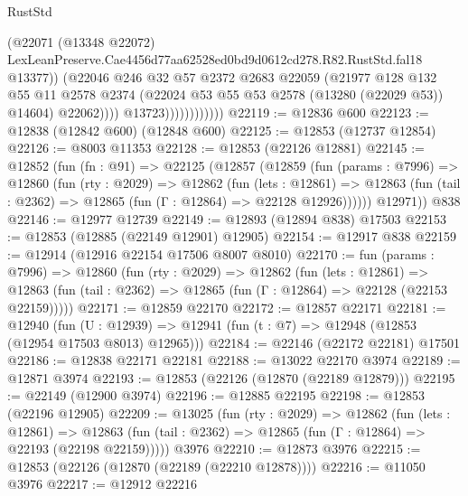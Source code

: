 \begin{lexlean}{RustStd}
\begin{coremodule}
                                  (@22071
                                    (@13348 @22072)
                                    LexLeanPreserve.Cae4456d77aa62528ed0bd9d0612cd278.R82.RustStd.fal18
                                    @13377))
                                (@22046
                                  @246
                                  @32
                                  @57
                                  @2372
                                  @2683
                                  @22059
                                  (@21977
                                    @128
                                    @132
                                    @55
                                    @11
                                    @2578
                                    @2374
                                    (@22024 @53 @55 @53 @2578 (@13280 (@22029 @53)) @14604)
                                    @22062))))
                            @13723))))))))))))
@22119 := @12836 @600
@22123 := @12838 (@12842 @600) (@12848 @600)
@22125 := @12853 (@12737 @12854)
@22126 := @8003 @11353
@22128 := @12853 (@22126 @12881)
@22145 := @12852
    (fun (fn : @91) =>
    @22125
      (@12857
        (@12859
          (fun (params : @7996) =>
          @12860
            (fun (rty : @2029) =>
            @12862
              (fun (lets : @12861) =>
              @12863 (fun (tail : @2362) => @12865 (fun (Γ : @12864) => @22128 @12926))))))
        @12971))
    @838
@22146 := @12977 @12739
@22149 := @12893 (@12894 @838) @17503
@22153 := @12853 (@12885 (@22149 @12901) @12905)
@22154 := @12917 @838
@22159 := @12914 (@12916 @22154 @17506 @8007 @8010)
@22170 := fun (params : @7996) =>
  @12860
    (fun (rty : @2029) =>
    @12862
      (fun (lets : @12861) =>
      @12863 (fun (tail : @2362) => @12865 (fun (Γ : @12864) => @22128 (@22153 @22159)))))
@22171 := @12859 @22170
@22172 := @12857 @22171
@22181 := @12940
    (fun (U : @12939) => @12941 (fun (t : @7) => @12948 (@12853 (@12954 @17503 @8013) @12965)))
@22184 := @22146 (@22172 @22181) @17501
@22186 := @12838 @22171 @22181
@22188 := @13022 @22170 @3974
@22189 := @12871 @3974
@22193 := @12853 (@22126 (@12870 (@22189 @12879)))
@22195 := @22149 (@12900 @3974)
@22196 := @12885 @22195
@22198 := @12853 (@22196 @12905)
@22209 := @13025
    (fun (rty : @2029) =>
    @12862
      (fun (lets : @12861) =>
      @12863 (fun (tail : @2362) => @12865 (fun (Γ : @12864) => @22193 (@22198 @22159)))))
    @3976
@22210 := @12873 @3976
@22215 := @12853 (@22126 (@12870 (@22189 (@22210 @12878))))
@22216 := @11050 @3976
@22217 := @12912 @22216

\end{coremodule}
\end{lexlean}
